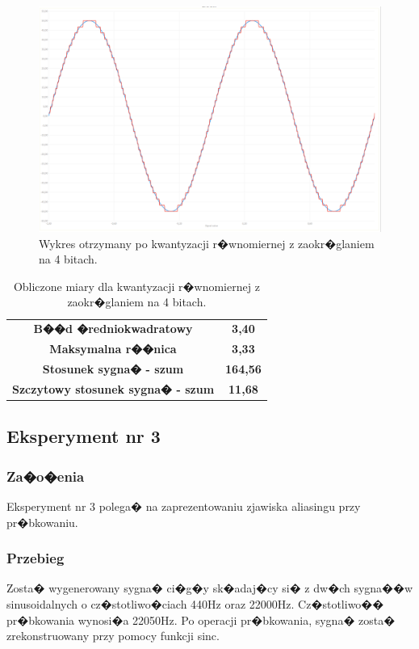\documentclass[12pt]{article}
\begin{document}
\begin{figure}[h!]
\includegraphics[scale=0.35]{w5.png}
\caption{Wykres otrzymany po kwantyzacji r�wnomiernej z zaokr�glaniem na 4 bitach.}
\end{figure}


\begin{table}[h!]
\centering
\caption{Obliczone miary dla kwantyzacji r�wnomiernej z zaokr�glaniem na 4 bitach.}
\begin{tabular}{c c}
\textbf{B��d �redniokwadratowy} & \textbf{3,40} \\
\textbf{Maksymalna r��nica} & \textbf{3,33} \\
\textbf{Stosunek sygna� - szum} & \textbf{164,56} \\
\textbf{Szczytowy stosunek sygna� - szum} & \textbf{11,68} \\
\end{tabular}
\end{table}

\newpage
\subsection{Eksperyment nr 3}
\subsubsection{Za�o�enia}
Eksperyment nr 3 polega� na zaprezentowaniu zjawiska aliasingu przy pr�bkowaniu.
\subsubsection{Przebieg}
Zosta� wygenerowany sygna� ci�g�y sk�adaj�cy si� z dw�ch sygna��w sinusoidalnych o cz�stotliwo�ciach 440Hz oraz 22000Hz. Cz�stotliwo�� pr�bkowania wynosi�a 22050Hz. Po operacji pr�bkowania, sygna� zosta� zrekonstruowany przy pomocy funkcji sinc. 
\end{document}
